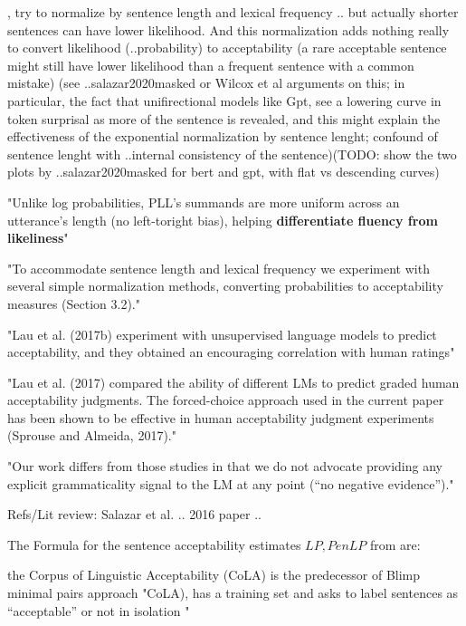 \citet{lau2020furiously}, try to normalize by sentence length and lexical frequency .. but actually shorter sentences can have lower likelihood. And this normalization adds nothing really to convert likelihood (..probability) to acceptability (a rare acceptable sentence might still have lower likelihood than a frequent sentence with a common mistake)
(see ..salazar2020masked or Wilcox et al arguments on this; in particular, the fact that unifirectional models like Gpt, see a lowering curve in token surprisal as more of the sentence is revealed, and this might explain the effectiveness of the exponential normalization by sentence lenght; confound of sentence lenght with ..internal consistency of the sentence)(TODO: show the two plots by ..salazar2020masked  for bert and gpt, with flat vs descending curves)

"Unlike log probabilities, PLL’s summands are more uniform across an utterance’s length (no left-toright bias), helping \textbf{differentiate fluency from likeliness}" \citep{salazar2020masked}


"To accommodate sentence length and lexical frequency we experiment with several simple normalization methods, converting probabilities
to acceptability measures (Section 3.2)." \citep{lau2020furiously}

"Lau et al. (2017b) experiment with unsupervised language models to predict acceptability, and they obtained an encouraging correlation with human ratings" \cite{lau2020furiously}

"Lau et al. (2017) compared the ability of different LMs to predict graded human acceptability judgments. The forced-choice approach used in the current paper has been shown to be effective in human
acceptability judgment experiments (Sprouse and Almeida, 2017)." \citep{marvin2018targeted}

"Our work differs from those studies in that we do not advocate providing any explicit grammaticality signal to the LM at any point (“no negative evidence”)." \citep{marvin2018targeted}

Refs/Lit review:
Salazar et al. ..
2016 paper
..

The Formula for the sentence acceptability estimates \( LP, PenLP \) from \citet{lau2020furiously} are:

the Corpus of Linguistic Acceptability (CoLA) is the predecessor of Blimp minimal pairs approach \citet{salazar2020masked}
"CoLA), has a training set and asks to label sentences as “acceptable” or not in isolation \citet{warstadt2019neural}"  \citet{salazar2020masked}

